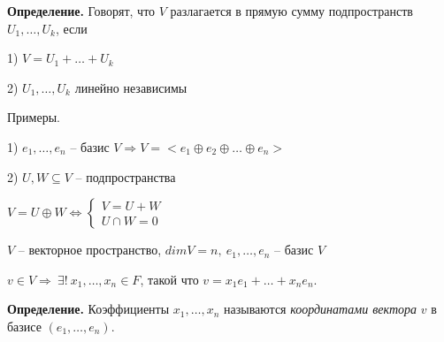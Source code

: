 \bigskip
\textbf{Определение.} Говорят, что $V$ разлагается в прямую сумму подпространств $U_1, \dots, U_k$, если 

1) $V = U_1 + \dots + U_k$  

2) $U_1, \dots, U_k$ линейно независимы

\bigskip
Примеры. 

1) $e_1, \dots, e_n$ -- базис $V \Rightarrow V = <e_1 \oplus e_2 \oplus \dots \oplus e_n>$ 

2) $U, W \subseteq V$ -- подпространства

$V = U \oplus W \Leftrightarrow \begin{cases} V = U + W \\
U \cap W = 0 \end{cases}$

\bigskip
$V$ -- векторное пространство, $dimV = n, \ e_1, \dots, e_n$ -- базис $V$

$v \in V \Rightarrow \ \exists ! \ x_1, \dots, x_n \in F$, такой что $v = x_1 e_1 + \dots + x_n e_n$.

\bigskip
\textbf{Определение.} Коэффициенты $x_1, \dots, x_n$ называются \textit{координатами вектора} $v$ в базисе $(e_1, \dots, e_n)$.

